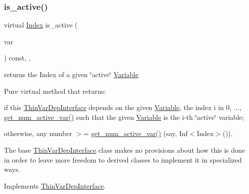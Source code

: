 \subsubsection{\texorpdfstring{is\+\_\+active()}{is\_active()}}
{\footnotesize\ttfamily virtual \mbox{\hyperlink{group___thin_var_dep_interface___c_l_a_s_s_e_s_gad53d6229d7ec28555a9c9c2fd9abf773}{Index}} is\+\_\+active (\begin{DoxyParamCaption}\item[{const \mbox{\hyperlink{class_s_m_spp__di__unipi__it_1_1_variable}{Variable}} $\ast$const}]{var }\end{DoxyParamCaption}) const\hspace{0.3cm}{\ttfamily [inline]}, {\ttfamily [override]}, {\ttfamily [virtual]}}



returns the Index of a given \char`\"{}active\char`\"{} \mbox{\hyperlink{class_s_m_spp__di__unipi__it_1_1_variable}{Variable}} 

Pure virtual method that returns\+:


\begin{DoxyItemize}
\item if this \mbox{\hyperlink{class_s_m_spp__di__unipi__it_1_1_thin_var_dep_interface}{Thin\+Var\+Dep\+Interface}} depends on the given \mbox{\hyperlink{class_s_m_spp__di__unipi__it_1_1_variable}{Variable}}, the index i in 0, ..., \mbox{\hyperlink{class_s_m_spp__di__unipi__it_1_1_f_row_constraint_acc8ac3c57cc2c71ac3fe6c409fe53074}{get\+\_\+num\+\_\+active\+\_\+var()}} such that the given \mbox{\hyperlink{class_s_m_spp__di__unipi__it_1_1_variable}{Variable}} is the i-\/th \char`\"{}active\char`\"{} variable;
\item otherwise, any number $>$= \mbox{\hyperlink{class_s_m_spp__di__unipi__it_1_1_f_row_constraint_acc8ac3c57cc2c71ac3fe6c409fe53074}{get\+\_\+num\+\_\+active\+\_\+var()}} (say, Inf$<$\+Index$>$()).
\end{DoxyItemize}

The base \mbox{\hyperlink{class_s_m_spp__di__unipi__it_1_1_thin_var_dep_interface}{Thin\+Var\+Dep\+Interface}} class makes no provisions about how this is done in order to leave more freedom to derived classes to implement it in specialized ways. 

Implements \mbox{\hyperlink{group___thin_var_dep_interface___c_l_a_s_s_e_s_ga05297a4e506f89ec692a01aca971ce2d}{Thin\+Var\+Dep\+Interface}}.

\mbox{\label{class_s_m_spp__di__unipi__it_1_1_f_row_constraint_ae95c7d10b4128f20cefa7bb25628f5f5}} 
